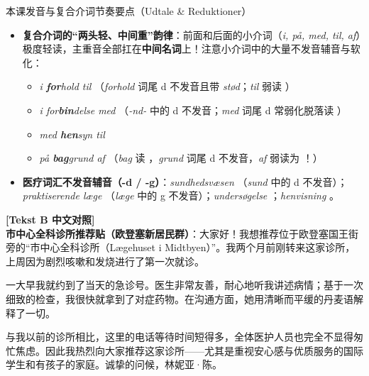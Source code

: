 \begin{tipbox}{本课发音与复合介词节奏要点（Udtale \& Reduktioner）}
\begin{itemize}
  \item \textbf{复合介词的“两头轻、中间重”韵律}：前面和后面的小介词（\textit{i, på, med, til, af}）极度轻读，主重音全部扛在\textbf{中间名词}上！注意小介词中的大量不发音辅音与软化：
    \begin{itemize}
      \item \textit{i \textbf{for}hold til} （\textit{forhold} 词尾 d 不发音且带 \textit{stød}；\textit{til} 弱读 ）
      \item \textit{i for\textbf{bin}delse med} （\textit{-nd-} 中的 d 不发音；\textit{med} 词尾 d 常弱化脱落读 ）
      \item \textit{med \textbf{hen}syn til} 
      \item \textit{på \textbf{bag}grund af} （\textit{bag} 读 ，\textit{grund} 词尾 d 不发音，\textit{af} 弱读为 ！）
    \end{itemize}
  \item \textbf{医疗词汇不发音辅音（-d / -g）}：\textit{sundhedsvæsen} （\textit{sund} 中的 d 不发音）；\textit{praktiserende læge} （\textit{læge} 中的 g 不发音）；\textit{undersøgelse} ；\textit{henvisning} 。
\end{itemize}
\end{tipbox}

\begin{transbox}
\small
\textbf{\color{NCDTeal}[Tekst B 中文对照]}\\
\textbf{市中心全科诊所推荐贴（欧登塞新居民群）}：大家好！我想推荐位于欧登塞国王街旁的“市中心全科诊所（Lægehuset i Midtbyen）”。我两个月前刚转来这家诊所，上周因为剧烈咳嗽和发烧进行了第一次就诊。

一大早我就约到了当天的急诊号。医生非常友善，耐心地听我讲述病情；基于一次细致的检查，我很快就拿到了对症药物。在沟通方面，她用清晰而平缓的丹麦语解释了一切。

与我以前的诊所相比，这里的电话等待时间短得多，全体医护人员也完全不显得匆忙焦虑。因此我热烈向大家推荐这家诊所——尤其是重视安心感与优质服务的国际学生和有孩子的家庭。诚挚的问候，林妮亚·陈。
\end{transbox}



